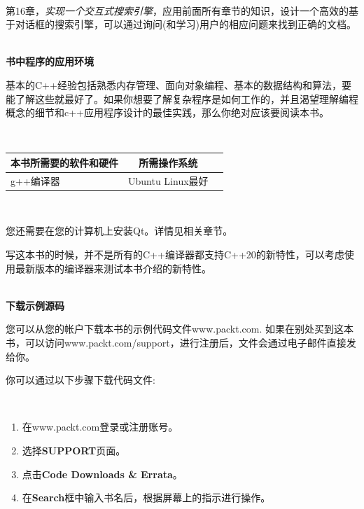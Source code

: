 \noindent\textbf{}\ \par
\textsf{第16章}，\textit{实现一个交互式搜索引擎}，应用前面所有章节的知识，设计一个高效的基于对话框的搜索引擎，可以通过询问(和学习)用户的相应问题来找到正确的文档。

\hspace*{\fill} \\ %
\noindent\textbf{书中程序的应用环境}\ \par
基本的C++经验包括熟悉内存管理、面向对象编程、基本的数据结构和算法，要能了解这些就最好了。如果你想要了解复杂程序是如何工作的，并且渴望理解编程概念的细节和c++应用程序设计的最佳实践，那么你绝对应该要阅读本书。 \par

\hspace*{\fill} \\ %
\begin{tabular}{|l|c|r|} %
	\hline 
	\textbf{本书所需要的软件和硬件}&\textbf{所需操作系统}\\
	\hline  
	g++编译器&Ubuntu Linux最好\\
	\hline 
\end{tabular}

\noindent\textbf{}\ \par
您还需要在您的计算机上安装Qt。详情见相关章节。\par

写这本书的时候，并不是所有的C++编译器都支持C++20的新特性，可以考虑使用最新版本的编译器来测试本书介绍的新特性。 \par

\hspace*{\fill} \\ %
\noindent\textbf{下载示例源码} \par
您可以从您的帐户下载本书的示例代码文件\textsf{www.packt.com}. 如果在别处买到这本书，可以访问\textsf{www.packt.com/support}，进行注册后，文件会通过电子邮件直接发给你。 \par

你可以通过以下步骤下载代码文件: \par

\noindent\textbf{}\ \par
\begin{enumerate}
	\item 在\textsf{www.packt.com}登录或注册账号。
	\item 选择\textbf{SUPPORT}页面。
	\item 点击\textbf{Code Downloads \& Errata}。
	\item 在\textbf{Search}框中输入书名后，根据屏幕上的指示进行操作。
\end{enumerate}

